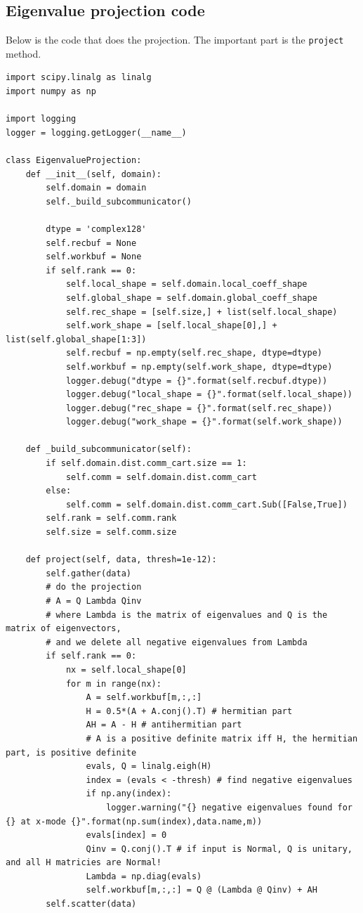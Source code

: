 \documentclass{jfm}
\begin{document}
\subsection{Eigenvalue projection code}
\label{sec:eig_code}
Below is the code that does the projection.
The important part is the \texttt{project} method.


\begin{verbatim}
import scipy.linalg as linalg
import numpy as np

import logging
logger = logging.getLogger(__name__)

class EigenvalueProjection:
    def __init__(self, domain):
        self.domain = domain
        self._build_subcommunicator()

        dtype = 'complex128'
        self.recbuf = None
        self.workbuf = None
        if self.rank == 0:
            self.local_shape = self.domain.local_coeff_shape
            self.global_shape = self.domain.global_coeff_shape
            self.rec_shape = [self.size,] + list(self.local_shape)
            self.work_shape = [self.local_shape[0],] + list(self.global_shape[1:3])
            self.recbuf = np.empty(self.rec_shape, dtype=dtype)
            self.workbuf = np.empty(self.work_shape, dtype=dtype)
            logger.debug("dtype = {}".format(self.recbuf.dtype))
            logger.debug("local_shape = {}".format(self.local_shape))
            logger.debug("rec_shape = {}".format(self.rec_shape))
            logger.debug("work_shape = {}".format(self.work_shape))

    def _build_subcommunicator(self):
        if self.domain.dist.comm_cart.size == 1:
            self.comm = self.domain.dist.comm_cart
        else:
            self.comm = self.domain.dist.comm_cart.Sub([False,True])
        self.rank = self.comm.rank
        self.size = self.comm.size

    def project(self, data, thresh=1e-12):
        self.gather(data)
        # do the projection
        # A = Q Lambda Qinv
        # where Lambda is the matrix of eigenvalues and Q is the matrix of eigenvectors,
        # and we delete all negative eigenvalues from Lambda
        if self.rank == 0:
            nx = self.local_shape[0]
            for m in range(nx):
                A = self.workbuf[m,:,:]
                H = 0.5*(A + A.conj().T) # hermitian part
                AH = A - H # antihermitian part
                # A is a positive definite matrix iff H, the hermitian part, is positive definite
                evals, Q = linalg.eigh(H)
                index = (evals < -thresh) # find negative eigenvalues
                if np.any(index):
                    logger.warning("{} negative eigenvalues found for {} at x-mode {}".format(np.sum(index),data.name,m))
                evals[index] = 0
                Qinv = Q.conj().T # if input is Normal, Q is unitary, and all H matricies are Normal!
                Lambda = np.diag(evals)
                self.workbuf[m,:,:] = Q @ (Lambda @ Qinv) + AH
        self.scatter(data)


\end{verbatim}
\end{document}
